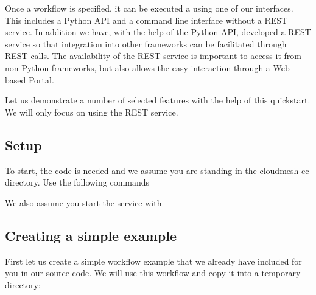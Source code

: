Once a workflow is specified, it can be executed a using one of our
interfaces. This includes a Python API and a command line interface
without a REST service. In addition we have, with the help of the Python
API, developed a REST service so that integration into other frameworks
can be facilitated through REST calls. The availability of the REST
service is important to access it from non Python frameworks, but also
allows the easy interaction through a Web-based Portal.

Let us demonstrate a number of selected features with the help of this
quickstart. We will only focus on using the REST service.

\hypertarget{setup}{%
\subsection{Setup}\label{setup}}

To start, the code is needed and we assume you are standing in the
cloudmesh-cc directory. Use the following commands

\begin{Shaded}
\begin{Highlighting}[]
\end{Highlighting}
\end{Shaded}

We also assume you start the service with

\begin{Shaded}
\begin{Highlighting}[]
\end{Highlighting}
\end{Shaded}

\hypertarget{creating-a-simple-example}{%
\subsection{Creating a simple example}\label{creating-a-simple-example}}

First let us create a simple workflow example that we already have
included for you in our source code. We will use this workflow and copy
it into a temporary directory:

\begin{Shaded}
\begin{Highlighting}[]
 
\PreprocessorTok{*}
\end{Highlighting}
\end{Shaded}

